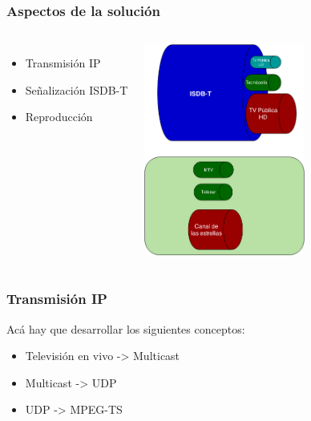 \documentclass[a4paper,11pt]{beamer}
\begin{document}

\begin{frame}
\frametitle{Aspectos de la solución}


\begin{columns}[c] %

\begin{itemize}
\item Transmisión IP
\item Señalización ISDB-T
\item Reproducción
\end{itemize}


\includegraphics[height=7cm]{isdbtcable_extended.png}

\end{columns}

\end{frame}




\begin{frame}
\frametitle{Transmisión IP}
Acá hay que desarrollar los siguientes conceptos:
\begin{itemize}
\item Televisión en vivo -> Multicast
\item Multicast -> UDP
\item UDP -> MPEG-TS
\end{itemize}
\end{frame}
\end{document}
